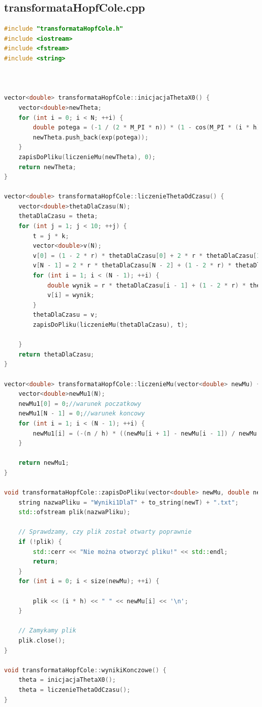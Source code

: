 \documentclass[10pt, a4paper]{article}
\begin{document}
\subsection{transformataHopfCole.cpp}
\begin{lstlisting}[caption={transformataHopfCole.cpp},label={transformataHopfColeCalyKod.cpp}, language=C++]
#include "transformataHopfCole.h"
#include <iostream>
#include <fstream>
#include <string>



vector<double> transformataHopfCole::inicjacjaThetaX0() {
	vector<double>newTheta;
	for (int i = 0; i < N; ++i) {
		double potega = (-1 / (2 * M_PI * n)) * (1 - cos(M_PI * (i * h)));
		newTheta.push_back(exp(potega));
	}
	zapisDoPliku(liczenieMu(newTheta), 0);
	return newTheta;
}

vector<double> transformataHopfCole::liczenieThetaOdCzasu() {
	vector<double>thetaDlaCzasu(N);
	thetaDlaCzasu = theta;
	for (int j = 1; j < 10; ++j) {
		t = j * k;
		vector<double>v(N);
		v[0] = (1 - 2 * r) * thetaDlaCzasu[0] + 2 * r * thetaDlaCzasu[1]; //warunki brzegowe  
		v[N - 1] = 2 * r * thetaDlaCzasu[N - 2] + (1 - 2 * r) * thetaDlaCzasu[N - 1];
		for (int i = 1; i < (N - 1); ++i) {
			double wynik = r * thetaDlaCzasu[i - 1] + (1 - 2 * r) * thetaDlaCzasu[i] + r * thetaDlaCzasu[i + 1];
			v[i] = wynik;
		}
		thetaDlaCzasu = v;
		zapisDoPliku(liczenieMu(thetaDlaCzasu), t);
		
	}
	return thetaDlaCzasu;
}

vector<double> transformataHopfCole::liczenieMu(vector<double> newMu) {
	vector<double>newMu1(N);
	newMu1[0] = 0;//warunek poczatkowy
	newMu1[N - 1] = 0;//warunek koncowy
	for (int i = 1; i < (N - 1); ++i) {
		newMu1[i] = (-(n / h) * ((newMu[i + 1] - newMu[i - 1]) / newMu[i]));
	}
	
	return newMu1;
}

void transformataHopfCole::zapisDoPliku(vector<double> newMu, double newT) {
	string nazwaPliku = "Wyniki1DlaT" + to_string(newT) + ".txt";
	std::ofstream plik(nazwaPliku);
	
	// Sprawdzamy, czy plik został otwarty poprawnie
	if (!plik) {
		std::cerr << "Nie można otworzyć pliku!" << std::endl;
		return;
	}
	for (int i = 0; i < size(newMu); ++i) {
		
		plik << (i * h) << " " << newMu[i] << '\n';
	}
	
	// Zamykamy plik
	plik.close();
}

void transformataHopfCole::wynikiKonczowe() {
	theta = inicjacjaThetaX0();
	theta = liczenieThetaOdCzasu();
}

\end{lstlisting}
\end{document}
